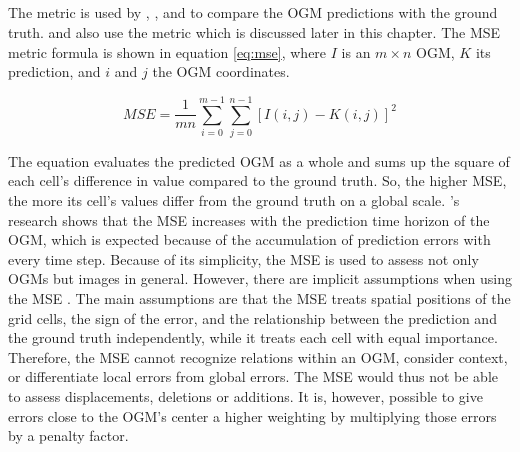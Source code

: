 \subsection{} \label{subsec:mse_met}
The  metric is used by \cite{itkina2019dynamic}, \cite{lange2020attention}, and \cite{toyungyernsub2020double} to compare the \gls{OGM} predictions with the ground truth. \cite{lange2020attention} and \cite{toyungyernsub2020double} also use the  metric which is discussed later in this chapter. The \gls{MSE} metric formula is shown in equation \ref{eq:mse}, where $I$ is an $m \times n$ \gls{OGM}, $K$ its prediction, and $i$ and $j$ the \gls{OGM} coordinates.

\begin{equation} \label{eq:mse}
	MSE = \frac{1}{mn}\sum_{i=0}^{m-1}\sum_{j=0}^{n-1}[I(i,j)-K(i,j)]^2
\end{equation}

The equation evaluates the predicted \gls{OGM} as a whole and sums up the square of each cell's difference in value compared to the ground truth. So, the higher \gls{MSE}, the more its cell's values differ from the ground truth on a global scale. \cite{toyungyernsub2020double}'s research shows that the \gls{MSE} increases with the prediction time horizon of the \gls{OGM}, which is expected because of the accumulation of prediction errors with every time step. Because of its simplicity, the \gls{MSE} is used to assess not only \glspl{OGM} but images in general. However, there are implicit assumptions when using the \gls{MSE} \cite{wang2009mean}. The main assumptions are that the \gls{MSE} treats spatial positions of the grid cells, the sign of the error, and the relationship between the prediction and the ground truth independently, while it treats each cell with equal importance. Therefore, the \gls{MSE} cannot recognize relations within an \gls{OGM}, consider context, or differentiate local errors from global errors. The \gls{MSE} would thus not be able to assess displacements, deletions or additions. It is, however, possible to give errors close to the \gls{OGM}'s center a higher weighting by multiplying those errors by a penalty factor.    

